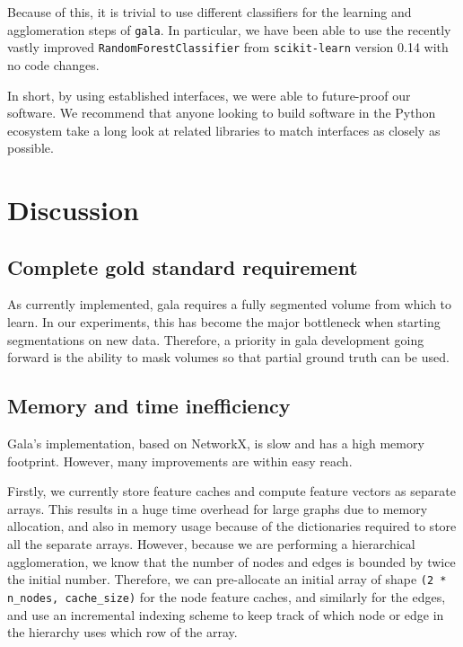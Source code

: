 \documentclass{frontiersSCNS} %
\begin{document}
Because of this, it is trivial to use different classifiers for the learning and agglomeration steps of \texttt{\small gala}.
In particular, we have been able to use the recently vastly improved \texttt{\small RandomForestClassifier} from \texttt{\small scikit-learn} version 0.14 with no code changes.

In short, by using established interfaces, we were able to future-proof our software.
We recommend that anyone looking to build software in the Python ecosystem take a long look at related libraries to match interfaces as closely as possible.


\section{Discussion}


\subsection{Complete gold standard requirement}

As currently implemented, gala requires a fully segmented volume from which to learn.
In our experiments, this has become the major bottleneck when starting segmentations on new data.
Therefore, a priority in gala development going forward is the ability to mask volumes so that partial ground truth can be used.

\subsection{Memory and time inefficiency}

Gala's implementation, based on NetworkX, is slow and has a high memory footprint.
However, many improvements are within easy reach.

Firstly, we currently store feature caches and compute feature vectors as separate arrays.
This results in a huge time overhead for large graphs due to memory allocation, and also in memory usage because of the dictionaries required to store all the separate arrays.
However, because we are performing a hierarchical agglomeration, we know that the number of nodes and edges is bounded by twice the initial number.
Therefore, we can pre-allocate an initial array of shape \texttt{\small (2 * n\_nodes, cache\_size)} for the node feature caches, and similarly for the edges, and use an incremental indexing scheme to keep track of which node or edge in the hierarchy uses which row of the array.
\end{document}
